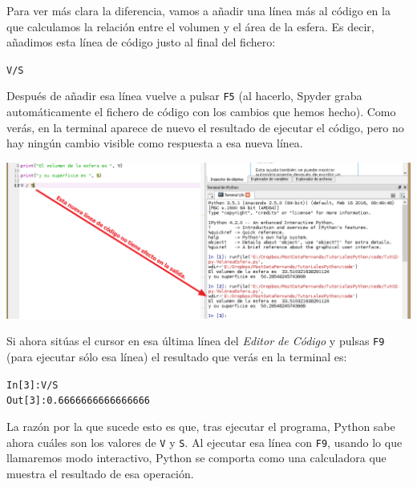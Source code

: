 \documentclass[10pt,a4paper]{article}\usepackage[]{graphicx}\usepackage[]{color}
\makeatletter
\newcommand{\hlnum}[1]{\textcolor[rgb]{0.686,0.059,0.569}{#1}}%
\newcommand{\hlopt}[1]{\textcolor[rgb]{0,0,0}{#1}}%
\newcommand{\hlstd}[1]{\textcolor[rgb]{0.345,0.345,0.345}{#1}}%
\newenvironment{kframe}{%
 \def\at@end@of@kframe{}%
 \ifinner\ifhmode%
  \def\at@end@of@kframe{\end{minipage}}%
  \begin{minipage}{\columnwidth}%
 \fi\fi%
 \def\FrameCommand##1{\hskip\@totalleftmargin \hskip-\fboxsep
 \colorbox{shadecolor}{##1}\hskip-\fboxsep
     \hskip-\linewidth \hskip-\@totalleftmargin \hskip\columnwidth}%
 \MakeFramed {\advance\hsize-\width
   \@totalleftmargin\z@ \linewidth\hsize
   \@setminipage}}%
 {\par\unskip\endMakeFramed%
 \at@end@of@kframe}
\newenvironment{knitrout}{}{} %
\makeatother
\begin{document}
Para ver más clara la diferencia, vamos a añadir una línea más al código en la que calculamos la relación entre el volumen y el área de la esfera. Es decir, añadimos esta línea de código justo al final del fichero:
\begin{knitrout}
\color{fgcolor}\begin{kframe}
\begin{alltt}
\hlstd{V} \hlopt{/} \hlstd{S}
\end{alltt}
\end{kframe}
\end{knitrout}
Después de añadir esa línea vuelve a pulsar {\tt F5} (al hacerlo, Spyder graba automáticamente el fichero de código con los cambios que hemos hecho). Como verás, en la terminal aparece de nuevo el resultado de ejecutar el código, pero no hay ningún cambio visible como respuesta a esa nueva línea. 
\begin{center}
\includegraphics[width=15cm]{../fig/Tut-02-py-29-CodigoSinEfectoVisible.png}
\end{center}
Si ahora sitúas el cursor en esa última línea del {\em Editor de Código} y pulsas {\tt F9} (para ejecutar sólo esa línea) el resultado que verás en la terminal es:
\begin{knitrout}
\color{fgcolor}\begin{kframe}
\begin{alltt}
\hlstd{In [}\hlnum{3}\hlstd{]}\hlopt{:} \hlstd{V} \hlopt{/} \hlstd{S}
\hlstd{Out[}\hlnum{3}\hlstd{]}\hlopt{:} \hlnum{0.6666666666666666}
\end{alltt}
\end{kframe}
\end{knitrout}
La razón por la que sucede esto es que, tras ejecutar el programa, Python sabe ahora cuáles son los valores de {\tt V} y {\tt S}. Al ejecutar esa línea con {\tt F9}, usando lo que llamaremos {\sf modo interactivo}, Python se comporta como una calculadora que muestra el resultado de esa operación.
\end{document}
